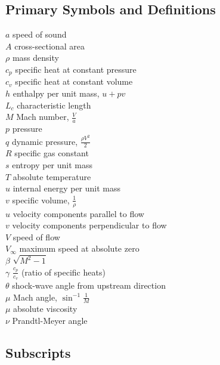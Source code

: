 \subsection*{Primary Symbols and Definitions}

\begin{multicols}{2}
\noindent$a$ \quad speed of sound \\
$A$ \quad cross-sectional area \\
$\rho$ \quad mass density \\
$c_p$ \quad specific heat at constant pressure \\
$c_v$ \quad specific heat at constant volume \\
$h$ \quad enthalpy per unit mass, $ u + pv $ \\
$L_c$ \quad characteristic length \\
$M$ \quad Mach number, $ \frac{V}{a} $ \\
$p$ \quad pressure \\
$q$ \quad dynamic pressure, $ \frac{\rho V^2}{2} $ \\
$R$ \quad specific gas constant \\
$s$ \quad entropy per unit mass \\
$T$ \quad absolute temperature \\
$u$ \quad internal energy per unit mass \\
$v$ \quad specific volume, $ \frac{1}{\rho} $ \\
$u$ \quad velocity components parallel to flow \\
$v$ \quad velocity components perpendicular to flow \\
$V$ \quad speed of flow \\
$V_\infty$ \quad maximum speed at absolute zero\\
$\beta$ \quad $ \sqrt{M^2 - 1} $ \\
$\gamma$ \quad $ \frac{c_p}{c_v} $ (ratio of specific heats) \\
$\theta$ \quad shock-wave angle from upstream direction \\
$\mu$ \quad Mach angle, $ \sin^{-1} \frac{1}{M} $ \\
$\mu$ \quad absolute viscosity \\
$\nu$ \quad Prandtl-Meyer angle \\
\end{multicols}

\subsection*{Subscripts}

